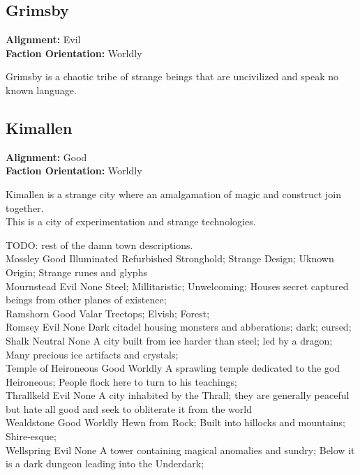 \documentclass[10pt,twoside,twocolumn]{article}
\begin{document}
\subsection{Grimsby}
\textbf{Alignment:} Evil \\
\textbf{Faction Orientation:} Worldly \\
\begin{quotebox}
	Grimsby is a chaotic tribe of strange beings that are uncivilized and speak no known language. \\
\end{quotebox}

\subsection{Kimallen}
\textbf{Alignment:} Good \\
\textbf{Faction Orientation:} Worldly \\
\begin{quotebox}
	Kimallen is a strange city where an amalgamation of magic and construct join together. \\

	This is a city of experimentation and strange technologies. \\
\end{quotebox}

TODO: rest of the damn town descriptions. \\
Mossley	Good	Illuminated	Refurbished Stronghold; Strange Design; Uknown Origin; Strange runes and glyphs\\
Mournstead	Evil	None	Steel; Millitaristic; Unwelcoming; Houses secret captured beings from other planes of existence;\\
Ramshorn	Good	Valar	Treetops; Elvish; Forest;\\
Romsey	Evil	None	Dark citadel housing monsters and abberations; dark; cursed;\\
Shalk	Neutral	None	A city built from ice harder than steel; led by a dragon; Many precious ice artifacts and crystals;\\
Temple of Heironeous	Good	Worldly	A sprawling temple dedicated to the god Heironeous; People flock here to turn to his teachings;\\
Thrallkeld	Evil	None	A city inhabited by the Thrall; they are generally peaceful but hate all good and seek to obliterate it from the world\\
Wealdstone	Good	Worldly	Hewn from Rock; Built into hillocks and mountains; Shire-esque;\\
Wellspring	Evil	None	A tower containing magical anomalies and sundry; Below it is a dark dungeon leading into the Underdark;\\
\end{document}
